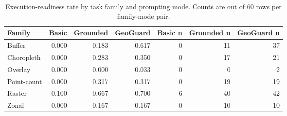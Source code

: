 \begin{table}[htbp]
\centering
\caption{Execution-readiness rate by task family and prompting mode. Counts are out of 60 rows per family-mode pair.}
\label{tab:family-execution-readiness}
\small
\begin{tabular}{lrrrrrr}
\toprule
Family & Basic & Grounded & GeoGuard & Basic n & Grounded n & GeoGuard n \\
\midrule
Buffer & 0.000 & 0.183 & 0.617 & 0 & 11 & 37 \\
Choropleth & 0.000 & 0.283 & 0.350 & 0 & 17 & 21 \\
Overlay & 0.000 & 0.000 & 0.033 & 0 & 0 & 2 \\
Point-count & 0.000 & 0.317 & 0.317 & 0 & 19 & 19 \\
Raster & 0.100 & 0.667 & 0.700 & 6 & 40 & 42 \\
Zonal & 0.000 & 0.167 & 0.167 & 0 & 10 & 10 \\
\bottomrule
\end{tabular}
\end{table}

